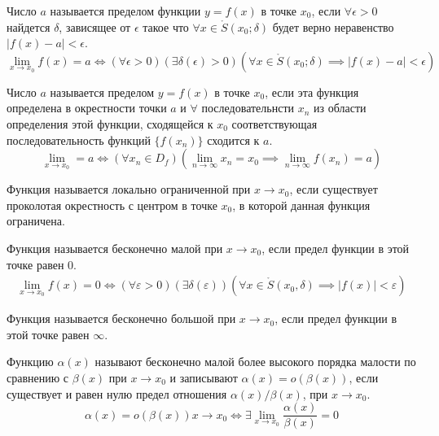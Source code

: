 \begin{definition} \label{def:28}
    Число $a$ называется пределом функции $y = f\left( x \right) $ в точке $x_0$, если $\forall \epsilon > 0$ найдется $\delta$, зависящее от  $\epsilon$ такое что $\forall x \in \mathring{S}(x_0; \delta)$ будет верно неравенство $|f\left( x \right) - a| < \epsilon$.
    \[
        \lim_{x \to x_0} f(x) = a \iff (\forall \epsilon > 0)(\exists  \delta(\epsilon) > 0)(\forall  x \in \mathring{S}(x_0; \delta) \implies |f(x) - a| < \epsilon)
    \]
\end{definition}


\begin{definition} \label{def:29}
    Число $a$ называется пределом $y = f\left( x \right) $ в точке $x_0$, если эта функция определена в окрестности точки $a$ и $\forall$ последовательнсти $x_{n}$ из области определения этой функции, сходящейся к $x_0$ соответствующая последовательность функций $\{f(x_{n})\}$ сходится к $a$. \[
        \lim_{x \to x_0} = a \iff (\forall x_{n}\in D_f)(\lim_{n \to \infty} x_{n} = x_0 \implies \lim_{n \to \infty} f(x_{n}) = a) 
    \] 
\end{definition}


\begin{definition} \label{def:34}
    Функция называется локально ограниченной при $x \to x_0$, если существует проколотая окрестность с центром в точке $x_0$, в которой данная функция ограничена.
\end{definition}


\begin{definition} \label{def:35}
    Функция называется бесконечно малой при $x \to x_0$, если предел функции в этой точке равен $0$.
    \begin{gather*}
        \lim_{x \to x_0} f(x) = 0 \iff (\forall \varepsilon > 0)(\exists \delta(\varepsilon)) (\forall x \in \mathring{S}(x_0, \delta) \implies |f(x)| < \varepsilon )
    \end{gather*}
\end{definition}


\begin{definition} \label{def:36}
    Функция называется бесконечно большой при $x \to x_0$, если предел функции в этой точке равен $\infty$.
\end{definition}


\begin{definition} \label{def:42}
    Функцию $\alpha(x)$ называют бесконечно малой более высокого порядка малости по сравнению с $\beta(x)$ при $x \to x_0$ и записывают $\alpha(x) = o(\beta(x))$, если существует и равен нулю предел отношения $\alpha(x)/\beta(x)$, при $x \to x_0$. \[
        \alpha(x) = o(\beta(x)) x \to x_0 \iff \exists \lim_{x \to x_0} \frac{\alpha(x)}{\beta(x)} = 0
    \]
\end{definition}


